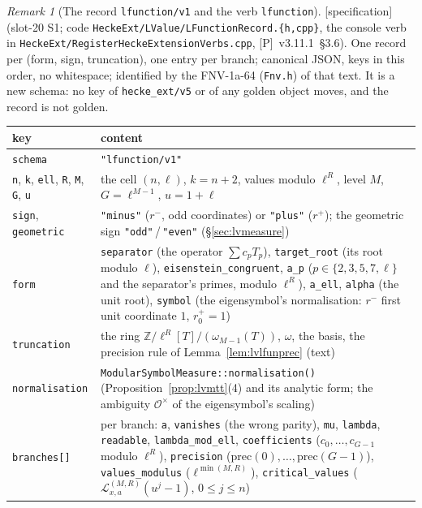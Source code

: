 \documentclass[11pt]{article}
\theoremstyle{remark}
\newtheorem{remark}[theorem]{Remark}
\newcommand{\Z}{\mathbb{Z}}
\newcommand{\SPEC}{\textsf{[specification]}}           %
\begin{document}
\begin{remark}[The record \texttt{lfunction/v1} and the verb \texttt{lfunction}]\label{rmk:lvlfunschema}
\SPEC{} (slot-20 S1; code \texttt{HeckeExt/LValue/LFunctionRecord.\{h,cpp\}}, the console verb in \texttt{HeckeExt/RegisterHeckeExtensionVerbs.cpp}, [P]~v3.11.1~\S3.6). One record per
(form, sign, truncation), one entry per branch; canonical JSON, keys in this order, no whitespace; identified by the FNV-1a-64 (\texttt{Fnv.h}) of that text. It is a new schema: no key
of \texttt{hecke\_ext/v5} or of any golden object moves, and the record is not golden.
\begin{center}\scriptsize
\begin{tabular}{@{}lp{}@{}}
\toprule
key & content \\
\midrule
\texttt{schema} & \texttt{"lfunction/v1"} \\
\texttt{n}, \texttt{k}, \texttt{ell}, \texttt{R}, \texttt{M}, \texttt{G}, \texttt{u} & the cell $(n,\ell)$, $k=n+2$, values modulo $\ell^{R}$, level $M$, $G=\ell^{M-1}$, $u=1+\ell$ \\
\texttt{sign}, \texttt{geometric} & \texttt{"minus"} ($r^{-}$, odd coordinates) or \texttt{"plus"} ($r^{+}$); the geometric sign \texttt{"odd"}\,/\,\texttt{"even"} (\S\ref{sec:lvmeasure}) \\
\texttt{form} & \texttt{separator} (the operator $\sum c_pT_p$), \texttt{target\_root} (its root modulo $\ell$), \texttt{eisenstein\_congruent}, \texttt{a\_p} ($p\in\{2,3,5,7,\ell\}$ and the separator's primes,
  modulo $\ell^{R}$), \texttt{a\_ell}, \texttt{alpha} (the unit root), \texttt{symbol} (the eigensymbol's normalisation: $r^{-}$ first unit coordinate $1$, $r^{+}_0=1$) \\
\texttt{truncation} & the ring $\Z/\ell^{R}[T]/(\omega_{M-1}(T))$, $\omega$, the basis, the precision rule of Lemma~\ref{lem:lvlfunprec} (text) \\
\texttt{normalisation} & \texttt{ModularSymbolMeasure::normalisation()} (Proposition~\ref{prop:lvmtt}(4) and its analytic form; the ambiguity $\mathcal O^{\times}$ of the eigensymbol's scaling) \\
\texttt{branches[]} & per branch: \texttt{a}, \texttt{vanishes} (the wrong parity), \texttt{mu}, \texttt{lambda}, \texttt{readable}, \texttt{lambda\_mod\_ell}, \texttt{coefficients} ($c_0,\dots,c_{G-1}$ modulo
  $\ell^{R}$), \texttt{precision} ($\mathrm{prec}(0),\dots,\mathrm{prec}(G-1)$), \texttt{values\_modulus} ($\ell^{\min(M,R)}$), \texttt{critical\_values} ($\mathcal L^{(M,R)}_{x,a}(u^{j}-1)$, $0\le j\le n$) \\

\end{tabular}
\end{center}
\end{remark}
\end{document}
